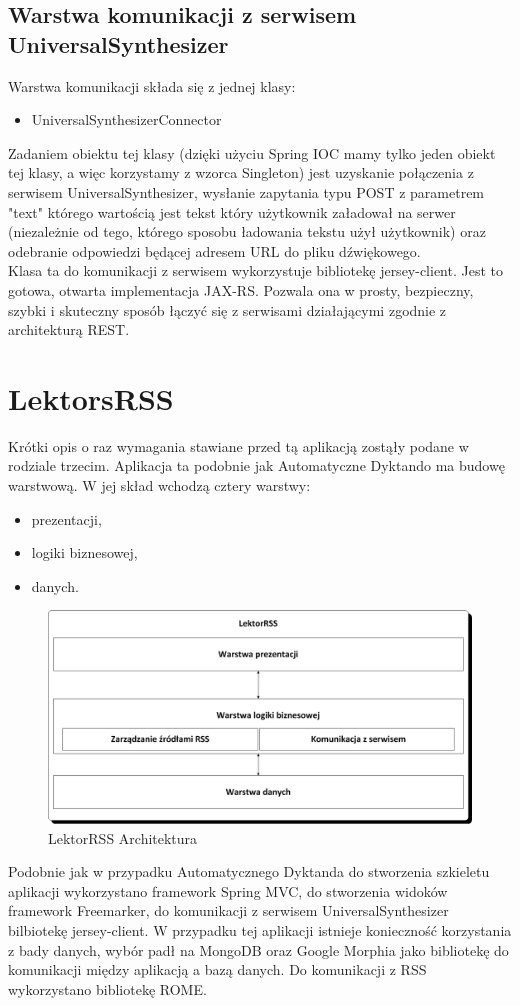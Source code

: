 \subsection{Warstwa komunikacji z serwisem UniversalSynthesizer}
Warstwa komunikacji składa się z jednej klasy:
\begin{itemize}
	\item UniversalSynthesizerConnector
\end{itemize}
Zadaniem obiektu tej klasy (dzięki użyciu Spring IOC mamy tylko jeden obiekt tej klasy, a więc korzystamy z wzorca Singleton) jest uzyskanie połączenia z serwisem UniversalSynthesizer, wysłanie zapytania typu POST  z parametrem "text" którego wartością jest tekst który użytkownik załadował na serwer (niezależnie od tego, którego sposobu ładowania tekstu użył użytkownik) oraz odebranie odpowiedzi będącej adresem URL do pliku dźwiękowego.\\
Klasa ta do komunikacji z serwisem wykorzystuje bibliotekę jersey-client. Jest to gotowa, otwarta implementacja JAX-RS. Pozwala ona w prosty, bezpieczny, szybki i skuteczny sposób łączyć się z serwisami działającymi zgodnie z architekturą REST.    
\section{LektorsRSS}
Krótki opis o raz wymagania stawiane przed tą aplikacją zostąły podane w rodziale trzecim. Aplikacja ta podobnie jak Automatyczne Dyktando ma budowę warstwową. W jej skład wchodzą cztery warstwy:
\begin{itemize}
	\item prezentacji,
	\item logiki biznesowej,
	\item danych.
\end{itemize}
\begin{figure}[!h]
	\centering
	\includegraphics[scale=0.45]{LektorRSSArchitecture.png} 
	\caption{LektorRSS Architektura}
\end{figure}
\newpage
Podobnie jak w przypadku Automatycznego Dyktanda do stworzenia szkieletu aplikacji wykorzystano framework Spring MVC, do stworzenia widoków framework Freemarker,  do komunikacji z serwisem UniversalSynthesizer bilbiotekę jersey-client. W przypadku tej aplikacji istnieje konieczność korzystania z bady danych, wybór padł na MongoDB oraz Google Morphia jako bibliotekę do komunikacji między aplikacją a bazą danych. Do komunikacji z RSS wykorzystano bibliotekę ROME.
